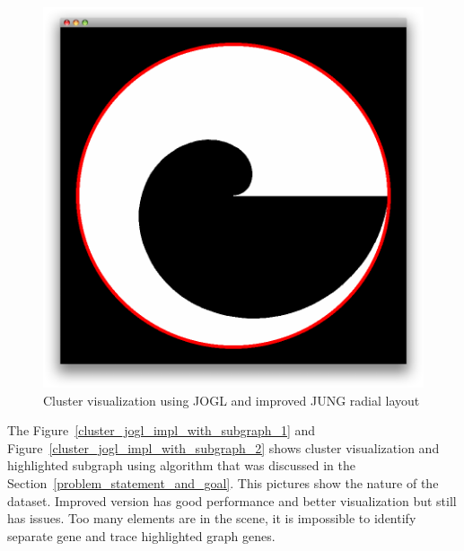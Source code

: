 \documentclass[a4paper,oneside]{article}
\begin{document}
\begin{figure}
\begin{center}
	\includegraphics[scale=0.3]{cluster_jogl_impl.png}
	\caption{Cluster visualization using JOGL and improved JUNG radial layout}
	\label{cluster_jogl_impl}
\end{center}
\end{figure}


The Figure~\ref{cluster_jogl_impl_with_subgraph_1} and Figure~\ref{cluster_jogl_impl_with_subgraph_2} shows cluster visualization and highlighted subgraph using algorithm that was discussed in the Section~\ref{problem_statement_and_goal}. This pictures show the nature of the dataset. Improved version has good performance and better visualization but still has issues. Too many elements are in the scene, it is impossible to identify separate gene and trace highlighted graph genes.
\end{document}
